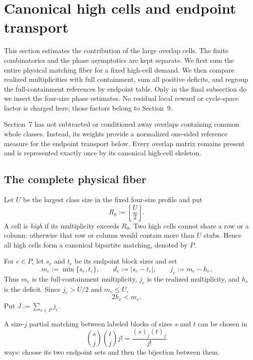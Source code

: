 \section{Canonical high cells and endpoint transport}
\label{sec:canonical-high-cells-v3}

This section estimates the contribution of the large overlap cells. The finite
combinatorics and the phase asymptotics are kept separate. We first sum the
entire physical matching fiber for a fixed high-cell demand. We then compare
realized multiplicities with full containment, sum all positive deficits, and
regroup the full-containment references by endpoint table. Only in the final
subsection do we insert the four-size phase estimates. No residual local reward
or cycle-space factor is charged here; those factors belong to Section~9.

Section~7 has not subtracted or conditioned away overlaps containing common
whole classes. Instead, its weights provide a normalized one-sided reference
measure for the endpoint transport below. Every overlap matrix remains present
and is represented exactly once by its canonical high-cell skeleton.

\subsection{The complete physical fiber}

Let $U$ be the largest class size in the fixed four-size profile and put
\[
  R_0:=\left\lfloor\frac U2\right\rfloor.
\]
A cell is \emph{high} if its multiplicity exceeds $R_0$. Two high cells cannot
share a row or a column: otherwise that row or column would contain more than
$U$ stubs. Hence all high cells form a canonical bipartite matching, denoted by
$P$.

For $e\in P$, let $s_e$ and $t_e$ be its endpoint block sizes and set
\[
  m_e:=\min\{s_e,t_e\},
  \qquad
  d_e:=|s_e-t_e|,
  \qquad
  j_e:=m_e-h_e.
\]
Thus $m_e$ is the full-containment multiplicity, $j_e$ is the realized
multiplicity, and $h_e$ is the deficit. Since $j_e>U/2$ and $m_e\le U$,
\begin{equation}
  2h_e<m_e.
  \label{eq:half-deficit-v3}
\end{equation}
Put $J:=\sum_{e\in P}j_e$.

A size-$j$ partial matching between labeled blocks of sizes $s$ and $t$ can be
chosen in
\[
  \binom sj\binom tj j!
  =
  \frac{(s)_j(t)_j}{j!}
\]
ways: choose its two endpoint sets and then the bijection between them.

